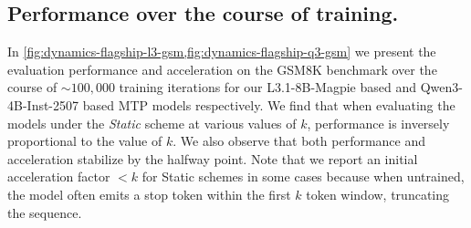 \documentclass{article}
\theoremstyle{plain}
\theoremstyle{definition}
\theoremstyle{remark}
\begin{document}
\subsection{Performance over the course of training.}
In \cref{fig:dynamics-flagship-l3-gsm,fig:dynamics-flagship-q3-gsm} we present the evaluation performance and acceleration on the GSM8K benchmark over the course of $\sim 100,000$ training iterations for our L3.1-8B-Magpie based and Qwen3-4B-Inst-2507 based MTP models respectively. We find that when evaluating the models under the \textit{Static} scheme at various values of $k$, performance is inversely proportional to the value of $k$. We also observe that both performance and acceleration stabilize by the halfway point.
Note that we report an initial acceleration factor $< k$ for Static schemes in some cases because when untrained, the model often emits a stop token within the first $k$ token window, truncating the sequence.
\end{document}
